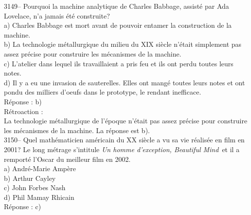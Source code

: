 \documentclass[letterpaper, 12pt]{article}
\begin{document}
3149-- Pourquoi la machine analytique de Charles Babbage, assist\'e par Ada Lovelace, n'a jamais \'et\'e construite?\\

a) Charles Babbage est mort avant de pouvoir entamer la construction de la machine.\\
b) La technologie m\'etallurgique du milieu du {\scriptsize XIX\ieme{}} si\`ecle n'\'etait simplement pas assez pr\'ecise pour construire les m\'ecanismes de la machine.\\
c) L'atelier dans lequel ils travaillaient a pris feu et ils ont perdu toutes leurs notes.\\
d) Il y a eu une invasion de sauterelles. Elles ont mang\'e toutes leurs notes et ont pondu des milliers d'oeufs dans le prototype, le rendant inefficace.\\

R\'eponse : b)\\

R\'etroaction :\\
La technologie m\'etallurgique de l'\'epoque n'\'etait pas assez pr\'ecise pour construire les m\'ecanismes de la machine. La r\'eponse est b).\\



3150-- Quel math\'ematicien am\'ericain du {\scriptsize XX\ieme{}} si\`ecle a vu sa vie r\'ealis\'ee en film en 2001? Le long m\'etrage s'intitule \og \emph{Un homme d'exception, Beautiful Mind}\fg \ et il a remport\'e l'Oscar du meilleur film en 2002.\\

a) Andr\'e-Marie Amp\`ere\\
b) Arthur Cayley\\
c) John Forbes Nash\\
d) Phil Mamay Rhicain  \\

R\'eponse : c)\\
\end{document}
